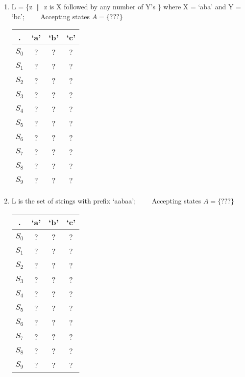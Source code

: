 \documentclass[10pt]{article}
\begin{document}
\begin{enumerate}
\begin{enumerate}
\item L = \{z $\|$ z is X followed by any number of Y's \} where X = `aba' and Y = `bc'; ~~~~Accepting states $A = \{???\}$
     \begin{center}
      \begin{tabular}{ |c|c|c|c| } 
        \hline
 .  & `a' & `b' & `c' \\\hline \hline
 $S_0$ & ? & ? & ?\\ \hline
 $S_1$ & ? & ? & ? \\ \hline
 $S_2$ & ? & ? & ? \\ \hline
 $S_3$ & ? & ? & ? \\ \hline
 $S_4$ & ? & ? & ? \\ \hline
 $S_5$ & ? & ? & ? \\ \hline
 $S_6$ & ? & ? & ? \\ \hline
 $S_7$ & ? & ? & ? \\ \hline
 $S_8$ & ? & ? & ? \\ \hline
 $S_9$ & ? & ? & ? \\ \hline
\end{tabular}
\end{center}

\item L is the set of strings with prefix `aabaa'; ~~~~Accepting states $A = \{???\}$
     \begin{center}
      \begin{tabular}{ |c|c|c|c| } 
        \hline
 .  & `a' & `b' & `c' \\\hline \hline
 $S_0$ & ? & ? & ?\\ \hline
 $S_1$ & ? & ? & ? \\ \hline
 $S_2$ & ? & ? & ? \\ \hline
 $S_3$ & ? & ? & ? \\ \hline
 $S_4$ & ? & ? & ? \\ \hline
 $S_5$ & ? & ? & ? \\ \hline
 $S_6$ & ? & ? & ? \\ \hline
 $S_7$ & ? & ? & ? \\ \hline
 $S_8$ & ? & ? & ? \\ \hline
 $S_9$ & ? & ? & ? \\ \hline
\end{tabular}
\end{center}


\end{enumerate}
\end{enumerate}
\end{document}
